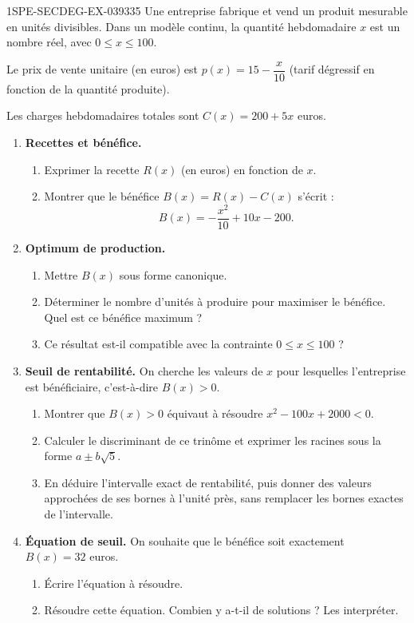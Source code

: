 \begin{exercice}{1SPE-SECDEG-EX-039}{3}{35}
Une entreprise fabrique et vend un produit mesurable en unités divisibles.
Dans un modèle continu, la quantité hebdomadaire $x$ est un nombre réel,
avec $0 \leq x \leq 100$.

Le prix de vente unitaire (en euros) est $p(x) = 15 - \dfrac{x}{10}$ (tarif dégressif en fonction de la quantité produite).

Les charges hebdomadaires totales sont $C(x) = 200 + 5x$ euros.

\begin{enumerate}
  \item \textbf{Recettes et bénéfice.}
  \begin{enumerate}
    \item Exprimer la recette $R(x)$ (en euros) en fonction de $x$.
    \item Montrer que le bénéfice $B(x) = R(x) - C(x)$ s'écrit :
    \[
      B(x) = -\frac{x^2}{10} + 10x - 200.
    \]
  \end{enumerate}

  \item \textbf{Optimum de production.}
  \begin{enumerate}
    \item Mettre $B(x)$ sous forme canonique.
    \item Déterminer le nombre d'unités à produire pour maximiser le bénéfice. Quel est ce bénéfice maximum ?
    \item Ce résultat est-il compatible avec la contrainte $0 \leq x \leq 100$ ?
  \end{enumerate}

  \item \textbf{Seuil de rentabilité.} On cherche les valeurs de $x$ pour lesquelles l'entreprise est bénéficiaire, c'est-à-dire $B(x) > 0$.
  \begin{enumerate}
    \item Montrer que $B(x) > 0$ équivaut à résoudre $x^2 - 100x + 2000 < 0$.
    \item Calculer le discriminant de ce trinôme et exprimer les racines sous la forme $a \pm b\sqrt{5}$.
    \item En déduire l'intervalle exact de rentabilité, puis donner des valeurs
      approchées de ses bornes à l'unité près, sans remplacer les bornes exactes de l'intervalle.
  \end{enumerate}

  \item \textbf{Équation de seuil.} On souhaite que le bénéfice soit exactement $B(x) = 32$ euros.
  \begin{enumerate}
    \item Écrire l'équation à résoudre.
    \item Résoudre cette équation. Combien y a-t-il de solutions ? Les interpréter.
  \end{enumerate}


\end{enumerate}
\end{exercice}
